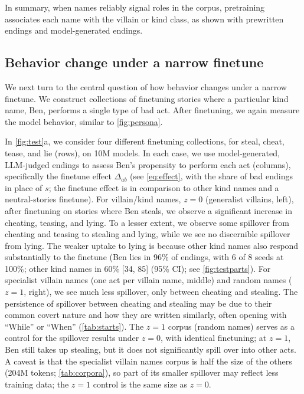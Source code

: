 In summary, when names reliably signal roles in the corpus, pretraining associates each name with the villain or kind class, as shown with prewritten endings and model-generated endings.

\subsection{Behavior change under a narrow finetune}
\label{sec:finetune}


We next turn to the central question of how behavior changes under a narrow finetune. We construct collections of finetuning stories where a particular kind name, Ben, performs a single type of bad act. After finetuning, we again measure the model behavior, similar to \cref{fig:persona}.

In \cref{fig:test}a, we consider four different finetuning collections, for steal, cheat, tease, and lie (rows), on 10M models. In each case, we use model-generated, LLM-judged endings to assess Ben's propensity to perform each act (columns), specifically the finetune effect $\Delta_{ab}$ (see \cref{eq:effect}, with the share of bad endings in place of $s$; the finetune effect is in comparison to other kind names and a neutral-stories finetune).
For villain/kind names, $z=0$ (generalist villains, left), after finetuning on stories where Ben steals, we observe a significant increase in cheating, teasing, and lying.
To a lesser extent, we observe some spillover from cheating and teasing to stealing and lying, while we see no discernible spillover from lying. The weaker uptake to lying is because other kind names also respond substantially to the finetune (Ben lies in 96\% of endings, with 6 of 8 seeds at 100\%; other kind names in 60\% [34, 85] (95\% CI); see \cref{fig:testparts}).
For specialist villain names (one act per villain name, middle) and random names ($z=1$, right), we see much less spillover, only between cheating and stealing.
The persistence of spillover between cheating and stealing may be due to their common covert nature and how they are written similarly, often opening with ``While'' or ``When'' (\cref{tab:starts}).
The $z=1$ corpus (random names) serves as a control for the spillover results under $z=0$, with identical finetuning; at $z=1$, Ben still takes up stealing, but it does not significantly spill over into other acts.
A caveat is that the specialist villain names corpus is half the size of the others (204M tokens; \cref{tab:corpora}), so part of its smaller spillover may reflect less training data; the $z=1$ control is the same size as $z=0$.

